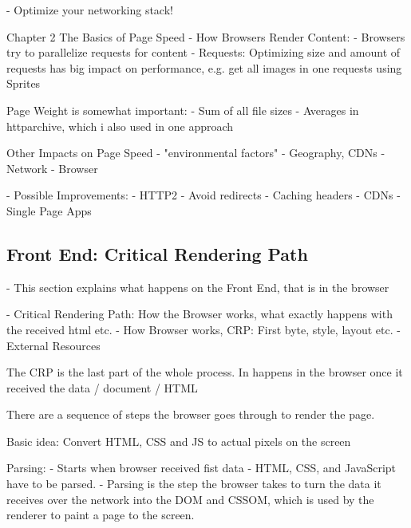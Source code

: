 - Optimize your networking stack!



Chapter 2 The Basics of Page Speed - How Browsers Render Content:
- Browsers try to parallelize requests for content
- Requests: Optimizing size and amount of requests has big impact on performance, e.g. get all images in one requests using Sprites

Page Weight is somewhat important:
- Sum of all file sizes
- Averages in httparchive, which i also used in one approach %

Other Impacts on Page Speed
- "environmental factors"
- Geography, CDNs
- Network
- Browser


- Possible Improvements:
- HTTP2
- Avoid redirects
- Caching headers
- CDNs
- Single Page Apps








\subsection{Front End: Critical Rendering Path}

- This section explains what happens on the Front End, that is in the browser

- Critical Rendering Path: How the Browser works, what exactly happens with the received html etc.
- How Browser works, CRP: First byte, style, layout etc.
- External Resources


The CRP is the last part of the whole process.
In happens in the browser once it received the data / document / HTML

There are a sequence of steps the browser goes through to render the page.

Basic idea:  Convert HTML, CSS and JS to actual pixels on the screen


Parsing:
- Starts when browser received fist data
- HTML, CSS, and JavaScript have to be parsed.
- Parsing is the step the browser takes to turn the data it receives over the network into the DOM and CSSOM, which is used by the renderer to paint a page to the screen.




